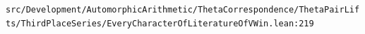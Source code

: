 \nolinkurl{src/Development/AutomorphicArithmetic/ThetaCorrespondence/ThetaPairLifts/ThirdPlaceSeries/EveryCharacterOfLiteratureOfVWin.lean:219}%

